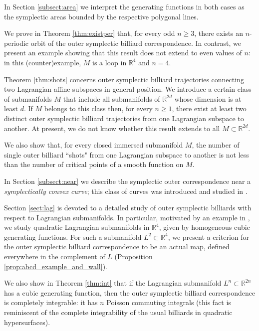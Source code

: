 \documentclass[12pt]{article}
\newcommand{\R}{{\mathbb R}}
\begin{document}
In Section \ref{subsect:area} we interpret the generating functions in both cases as the symplectic areas bounded by the respective polygonal lines. 

We prove in Theorem \ref{thm:existper} that, for every odd $n \ge 3$, there exists an $n$-periodic orbit of the outer symplectic billiard correspondence. In contrast, we present an example showing that this result does not extend to even values of $n$: in this (counter)example, $M$ is a loop in $\R^4$ and $n=4$.

Theorem \ref{thm:shots} concerns outer symplectic billiard trajectories connecting two Lagrangian affine subspaces in general position. We introduce a certain class of submanifolds $M$ that include all submanifolds 
of $\R^{2d}$ whose dimension is at least $d$. If $M$ belongs to this class then, for every $n\ge 1$, there exist at least two distinct outer symplectic billiard trajectories from one Lagrangian subspace to another. At present, we do not know whether this result extends to all $M \subset \R^{2d}$.

We also show that, for every closed immersed submanifold $M$, the number of single outer billiard ``shots" from one Lagrangian subspace to another is not less than the number of critical points of a smooth function on $M$.

 In Section \ref{subsect:near} we describe the symplectic outer correspondence near a {\it symplectically convex curve}; this class of curves was introduced and studied in \cite{AT}.

Section \ref{sect:lag} is devoted to a detailed study of outer symplectic billiards with respect to Lagrangian submanifolds. In particular, motivated by an example in \cite{FT2}, we study quadratic Lagrangian submanifolds in $\R^4$, given by homogeneous cubic generating functions. For such a submanifold $L^2 \subset \R^4$, we present a criterion for the outer symplectic billiard correspondence to be an actual map, defined everywhere in the complement of $L$ (Proposition \ref{prop:abcd_example_and_wall}).

We also show in Theorem \ref{thm:int} that if the Lagrangian submanifold $L^n \subset \R^{2n}$ has a cubic generating function, then the outer symplectic billiard correspondence is completely integrable: it has $n$ Poisson commuting integrals (this fact is reminiscent of the complete integrability of the usual billiards in quadratic hypersurfaces).

\end{document}

